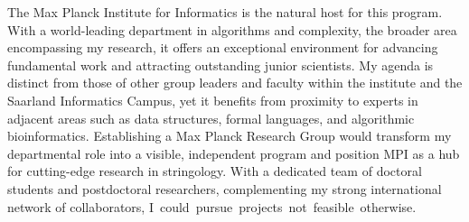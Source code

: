 \documentclass[a4paper,11pt]{article}
\begin{document}
The Max Planck Institute for Informatics is the natural host for this program. With a world-leading department in algorithms and complexity, the broader area encompassing my research, it offers an exceptional environment for advancing fundamental work and attracting outstanding junior scientists. My agenda is distinct from those of other group leaders and faculty within the institute and the Saarland Informatics Campus, yet it benefits from proximity to experts in adjacent areas such as data structures, formal languages, and algorithmic bioinformatics. Establishing a Max Planck Research Group would transform my departmental role into a visible, independent program and position MPI as a hub for cutting-edge research in stringology. With a dedicated team of doctoral students and postdoctoral researchers, complementing my strong international network of collaborators, \mbox{I could pursue projects not feasible otherwise}.
\end{document}

